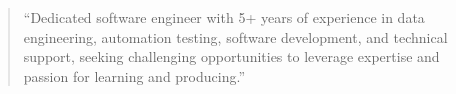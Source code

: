 \documentclass[10pt,a4paper,ragged2e,withhyper]{altacv}
\begin{document}
\begin{paracol}{2}




\switchcolumn


\begin{quote}
``Dedicated software engineer with 5+ years of experience in data engineering, automation testing, software development, and technical support, seeking challenging opportunities to leverage expertise and passion for learning and producing.''
\end{quote}








\\

\divider\smallskip

\\


\divider

\divider


\medskip


\end{paracol}
\end{document}
